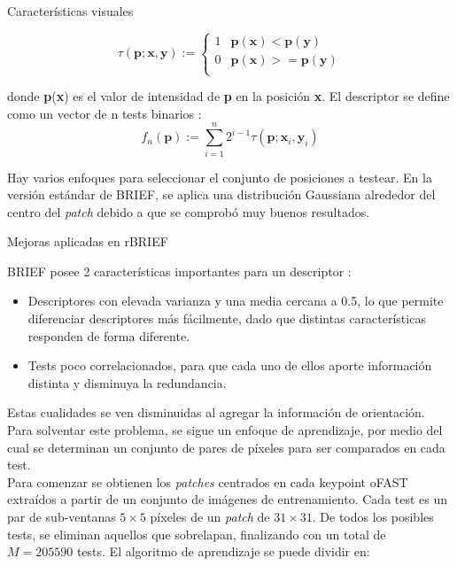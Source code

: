 \begin{section}{Características visuales}
\begin{subsection}
\begin{subsection}
\begin{subsection}
\begin{equation}
\tau(\textbf{p}; \textbf{x}, \textbf{y}) := \left\lbrace
\begin{array}{cc}
1 & \textbf{p}(\textbf{x}) < \textbf{p}(\textbf{y}) \\
0 & \textbf{p}(\textbf{x}) >= \textbf{p}(\textbf{y}) \\
\end{array}
\right.
\end{equation}

donde \textbf{p}(\textbf{x}) es el valor de intensidad de \textbf{p} en la posición \textbf{x}.
El descriptor se define como un vector de n tests binarios :
\begin{equation}
f_{n}(\textbf{p}) := \sum_{i=1}^{n} 2^{i-1}\tau(\textbf{p}; \textbf{x}_{i}, \textbf{y}_{i})
\end{equation}

Hay varios enfoques para seleccionar el conjunto de posiciones a testear. En la versión estándar de BRIEF, se aplica una distribución Gaussiana alrededor del centro del \textit{patch} debido a que se comprobó muy buenos resultados.
\end{subsection}

\begin{subsection}
{Mejoras aplicadas en rBRIEF}

BRIEF posee 2 características importantes para un descriptor :
\begin{itemize}

\item Descriptores con elevada varianza y una media cercana a 0.5, lo que permite diferenciar descriptores más fácilmente, dado que distintas características responden de forma diferente.

\item Tests poco correlacionados, para que cada uno de ellos aporte información distinta y disminuya la redundancia.

\end{itemize}

Estas cualidades se ven disminuidas al agregar la información de orientación. Para solventar este problema, se sigue un enfoque de aprendizaje, por medio del cual se determinan un conjunto de pares de píxeles para ser comparados en cada test. \\
Para comenzar se obtienen los \textit{patches} centrados en cada keypoint oFAST extraídos a partir de un conjunto de imágenes de entrenamiento. Cada test es un par de sub-ventanas $5 \times 5$ píxeles de un \textit{patch} de $31 \times 31$. De todos los posibles tests, se eliminan aquellos que sobrelapan, finalizando con un total de $M = 205590$ tests.
El algoritmo de aprendizaje se puede dividir en:


\end{subsection}
\end{subsection}
\end{subsection}
\end{section}
